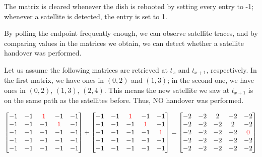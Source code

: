 \documentclass[IN,11pt,twoside,openright,idp,english]{tumthesis}
\begin{document}
The matrix is cleared whenever the dish is rebooted by setting every entry to -1; whenever a satellite is detected, the entry is set to 1. 

By polling the endpoint frequently enough, we can observe satellite traces, and by comparing values in the matrices we obtain, we can detect whether a satellite handover was performed.

Let us assume the following matrices are retrieved at $ t_x $ and $ t_{x+1} $, respectively. 
In the first matrix, we have ones in $ (0,2) $ and $ (1,3) $; in the second one, we have ones in $ (0,2) $, $ (1,3) $, $ (2,4) $. This means the new satellite we saw at $ t_{x+1} $ is on the same path as the satellites before. Thus, NO handover was performed. \vspace{10mm}

$\begin{bmatrix}
-1 & -1 & \color{red}1 &           -1 & -1 \\
-1 & -1 &           -1 & \color{red}1 & -1 \\
-1 & -1 &           -1 &           -1 & -1 \\
-1 & -1 &           -1 &           -1 & -1 \\
-1 & -1 &           -1 &           -1 & -1 \\ 
\end{bmatrix}
+
\begin{bmatrix}
-1 & -1 & \color{red}1 &           -1 &           -1 \\
-1 & -1 &           -1 & \color{red}1 &           -1 \\
-1 & -1 &           -1 &           -1 & \color{red}1 \\
-1 & -1 &           -1 &           -1 &           -1 \\
-1 & -1 &           -1 &           -1 &           -1 \\
\end{bmatrix}
=
\begin{bmatrix}
-2 & -2 & 2 &  -2 &           -2 \\
-2 & -2 & -2 &  2 &           -2 \\
-2 & -2 & -2 & -2 & \color{red}0 \\
-2 & -2 & -2 & -2 &            -2 \\
-2 & -2 & -2 & -2 &            -2 \\
\end{bmatrix}$ \vspace{10mm}
\end{document}
